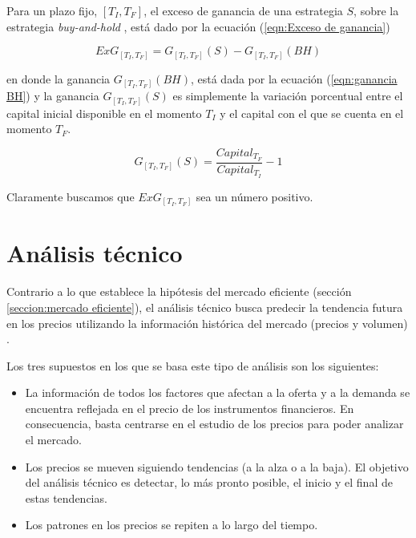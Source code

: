 \documentclass[12pt]{scrbook}
\theoremstyle{break}
\theoremstyle{break}
\newcommand{\buyhold}{\textit{buy-and-hold }}
\begin{document}
Para un plazo fijo, $\left[T_{I}, T_{F}\right]$, el exceso de ganancia de una estrategia $S$, sobre la estrategia \buyhold, está dado por la ecuación (\ref{eqn:Exceso de ganancia})

\begin{equation} \label{eqn:Exceso de ganancia}
ExG_{\left[T_{I}, T_{F}\right]} = G_{\left[T_{I}, T_{F}\right]} (S) - G_{\left[T_{I}, T_{F}\right]} (BH)
\end{equation}

en donde la ganancia $G_{\left[T_{I}, T_{F}\right]} (BH)$, está dada por la ecuación (\ref{eqn:ganancia BH}) y la ganancia $G_{\left[T_{I}, T_{F}\right]} (S)$ es simplemente la variación porcentual entre el capital inicial disponible en el momento $T_{I}$ y el capital con el que se cuenta en el momento $T_{F}$.

\begin{equation} \label{eqn:Ganancia estrategia S}
G_{\left[T_{I}, T_{F}\right]}(S) = \dfrac{Capital_{T_F}}{Capital_{T_I} } - 1 
\end{equation}

Claramente buscamos que $ExG_{\left[T_{I}, T_{F}\right]}$ sea un número positivo.

\section{Análisis técnico}
\label{seccion:analisisTecnico}
Contrario a lo que establece la hipótesis del mercado eficiente (sección \ref{seccion:mercado eficiente}), el análisis técnico busca predecir la tendencia futura en los precios utilizando la información histórica del mercado (precios y volumen) \cite{murphy1999technical}.

Los tres supuestos en los que se basa este tipo de análisis son los siguientes:

\begin{itemize}
\item La información de todos los factores que afectan a la oferta y a la demanda se encuentra reflejada en el precio de los instrumentos financieros. En consecuencia, basta centrarse en el estudio de los precios para poder analizar el mercado.

\item Los precios se mueven siguiendo tendencias (a la alza o a la baja). El objetivo del análisis técnico es detectar, lo más pronto posible, el inicio y el final de estas tendencias.

\item Los patrones en los precios se repiten a lo largo del tiempo.
\end{itemize}
\end{document}
